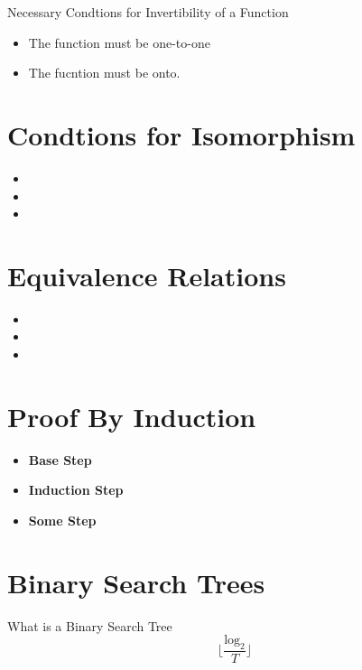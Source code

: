 Necessary Condtions for Invertibility of a Function
\begin{itemize}
\item The function must be one-to-one
\item The fucntion must be onto.
\end{itemize}

\section*{Condtions for Isomorphism}
\begin{itemize}
\item
\item
\item
\end{itemize}

\section*{Equivalence Relations}
\begin{itemize}
\item
\item
\item
\end{itemize}


\section*{Proof By Induction}

\begin{itemize}
\item \textbf{Base Step}
\item \textbf{Induction Step}
\item \textbf{Some Step}
\end{itemize}

\section*{Binary Search Trees}
What is a Binary Search Tree
\[ \lfloor  \frac{\mbox{log}_2}{T} \rfloor \]

